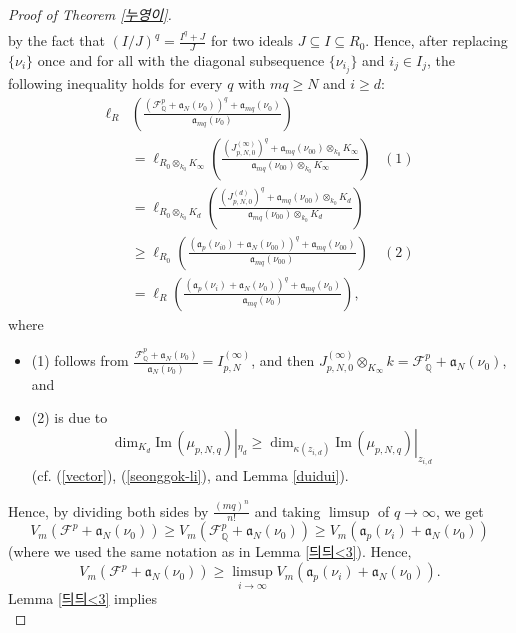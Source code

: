 \documentclass[a4paper,12pt]{amsart}
\theoremstyle{definition} %
\theoremstyle{remark}
\numberwithin{equation}{section}
\newcommand{\Q}{\mathbb{Q}}
\begin{document}
\begin{proof}[Proof of Theorem \ref{누영이}]
\begin{equation}
\begin{aligned}
\end{aligned}
\end{equation}
by the fact that $(I/J)^q=\frac{I^q+J}{J}$ for two ideals $J\subseteq I\subseteq R_{0}$. Hence, after replacing $\{\nu_i\}$ once and for all with the diagonal subsequence $\{\nu_{i_j}\}$ and $i_j\in I_j$, the following inequality holds for every $q$ with $mq\ge N$ and $i\ge d$:
$$ 
\begin{aligned}
\ell_R&\left(\frac{(\mathcal{F}^p_{\mathbb{Q}}+\mathfrak{a}_N(\nu_{0}))^q+\mathfrak{a}_{mq}(\nu_{0})}{\mathfrak{a}_{mq}(\nu_{0})}\right) & \\ &=\ell_{R_0\otimes_{k_0}K_{\infty}}\left(\frac{\left(J^{(\infty)}_{p,N,0}\right)^q+\mathfrak{a}_{mq}(\nu_{00})\otimes_{k_0}K_{\infty}}{\mathfrak{a}_{mq}(\nu_{00})\otimes_{k_0}K_{\infty}}\right) & (1)
\\ &=\ell_{R_0\otimes_{k_0}K_d}\left(\frac{\left(J^{(d)}_{p,N,0}\right)^q+\mathfrak{a}_{mq}(\nu_{00})\otimes_{k_0}K_{d}}{\mathfrak{a}_{mq}(\nu_{00})\otimes_{k_0}K_{d}}\right) &
\\ &\ge \ell_{R_0}\left(\frac{(\mathfrak{a}_{p}(\nu_{i0})+\mathfrak{a}_N(\nu_{00}))^q+\mathfrak{a}_{mq}(\nu_{00})}{\mathfrak{a}_{mq}(\nu_{00})}\right) & (2)
\\ &=\ell_R\left(\frac{(\mathfrak{a}_{p}(\nu_{i})+\mathfrak{a}_N(\nu_{0}))^q+\mathfrak{a}_{mq}(\nu_{0})}{\mathfrak{a}_{mq}(\nu_{0})}\right), &
\end{aligned}
$$
where
\begin{itemize}
\item (1) follows from $\frac{\mathcal{F}^{p}_{\Q}+\mathfrak{a}_N(\nu_0)}{\mathfrak{a}_N(\nu_0)}=I^{(\infty)}_{p,N}$, and then $J^{(\infty)}_{p,N,0}\otimes_{K_{\infty}}k=\mathcal{F}^p_{\mathbb{Q}}+\mathfrak{a}_N(\nu_0)$, and
    \item (2) is due to
    $$ \dim_{K_d}\mathrm{Im}\,(\mu_{p,N,q})|_{\eta_d}\ge \dim_{\kappa(z_{i,d})}\mathrm{Im}\,(\mu_{p,N,q})|_{z_{i,d}}$$
    (cf. (\ref{vector}), (\ref{seonggok-li}), and Lemma \ref{duidui}).
\end{itemize}
Hence, by dividing both sides by $\frac{(mq)^n}{n!}$ and taking $\limsup$ of $q\to \infty$, we get
$$ V_m(\mathcal{F}^p+\mathfrak{a}_N(\nu_0))\ge V_m(\mathcal{F}^p_{\mathbb{Q}} +\mathfrak{a}_N(\nu_0))\ge V_m(\mathfrak{a}_{p}(\nu_i)+\mathfrak{a}_N(\nu_0))$$
(where we used the same notation as in Lemma \ref{듸듸<3}). Hence,
$$ V_m(\mathcal{F}^p+\mathfrak{a}_N(\nu_0))\ge \limsup_{i\to \infty}V_m(\mathfrak{a}_{p}(\nu_i)+\mathfrak{a}_N(\nu_0)).$$
Lemma \ref{듸듸<3} implies
\begin{equation} \label{D_m}

\end{equation}
\end{proof}
\end{document}
